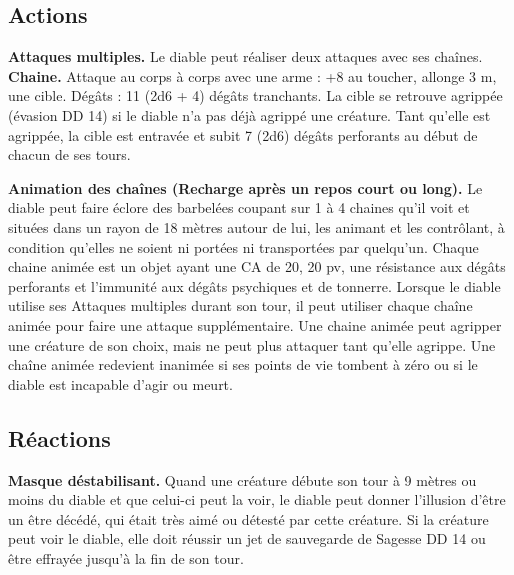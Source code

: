 \begin{figure*}[hb!]
{\begin{minipage}[c]{.45\linewidth}
    \subsection*{Actions}
    {\bfseries Attaques multiples.} Le diable peut réaliser deux attaques avec ses chaînes. \\
    {\bfseries Chaine.} Attaque au corps à corps avec une arme : +8 au toucher, allonge 3 m, une cible. Dégâts : 11 (2d6 + 4) dégâts tranchants. La cible se retrouve agrippée (évasion DD 14) si le diable n'a pas déjà agrippé une créature. Tant qu'elle est agrippée, la cible est entravée et subit 7 (2d6) dégâts perforants au début de chacun de ses tours. 
  \end{minipage}
  \hspace{4pt}
  \begin{minipage}[c]{.45\linewidth}
    {\bfseries Animation des chaînes (Recharge après un repos court ou long).} Le diable peut faire éclore des barbelées coupant sur 1 à 4 chaines qu'il voit et situées dans un rayon de 18 mètres autour de lui, les animant et les contrôlant, à condition qu'elles ne soient ni portées ni transportées par quelqu'un. Chaque chaine animée est un objet ayant une CA de 20, 20 pv, une résistance aux dégâts perforants et l'immunité aux dégâts psychiques et de tonnerre. Lorsque le diable utilise ses Attaques multiples durant son tour, il peut utiliser chaque chaîne animée pour faire une attaque supplémentaire. Une chaine animée peut agripper une créature de son choix, mais ne peut plus attaquer tant qu'elle agrippe. Une chaîne animée redevient inanimée si ses points de vie tombent à zéro ou si le diable est incapable d'agir ou meurt. 
\vspace{-10pt}
    \subsection*{Réactions}
    {\bfseries Masque déstabilisant.} Quand une créature débute son tour à 9 mètres ou moins du diable et que celui-ci peut la voir, le diable peut donner l'illusion d'être un être décédé, qui était très aimé ou détesté par cette créature. Si la créature peut voir le diable, elle doit réussir un jet de sauvegarde de Sagesse DD 14 ou être effrayée jusqu'à la fin de son tour. \\
  \end{minipage}
}%
\end{figure*}

